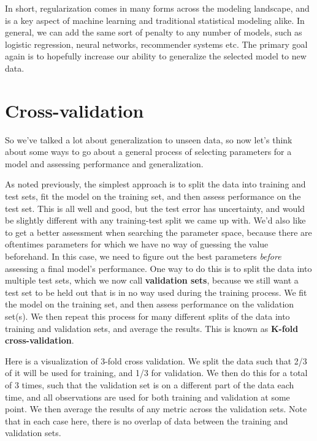 \documentclass[
  letterpaper,
]{krantz}
\begin{document}
In short, regularization comes in many forms across the modeling
landscape, and is a key aspect of machine learning and traditional
statistical modeling alike. In general, we can add the same sort of
penalty to any number of models, such as logistic regression, neural
networks, recommender systems etc. The primary goal again is to
hopefully increase our ability to generalize the selected model to new
data.

\section{Cross-validation}\label{sec-ml-cv}

So we've talked a lot about generalization to unseen data, so now let's
think about some ways to go about a general process of selecting
parameters for a model and assessing performance and generalization.

As noted previously, the simplest approach is to split the data into
training and test sets, fit the model on the training set, and then
assess performance on the test set. This is all well and good, but the
test error has uncertainty, and would be slightly different with any
training-test split we came up with. We'd also like to get a better
assessment when searching the parameter space, because there are
oftentimes parameters for which we have no way of guessing the value
beforehand. In this case, we need to figure out the best parameters
\emph{before} assessing a final model's performance. One way to do this
is to split the data into multiple test sets, which we now call
\textbf{validation sets}, because we still want a test set to be held
out that is in no way used during the training process. We fit the model
on the training set, and then assess performance on the validation
set(s). We then repeat this process for many different splits of the
data into training and validation sets, and average the results. This is
known as \textbf{K-fold cross-validation}.

Here is a visualization of 3-fold cross validation. We split the data
such that 2/3 of it will be used for training, and 1/3 for validation.
We then do this for a total of 3 times, such that the validation set is
on a different part of the data each time, and all observations are used
for both training and validation at some point. We then average the
results of any metric across the validation sets. Note that in each case
here, there is no overlap of data between the training and validation
sets.
\end{document}
